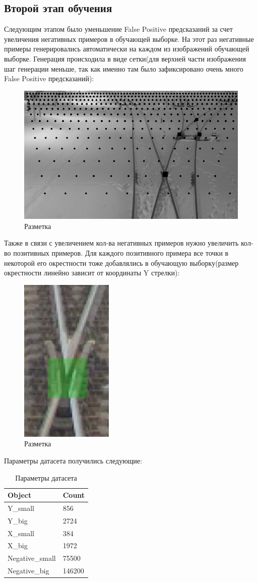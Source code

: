 \subsection{Второй этап обучения}
Следующим этапом было уменьшение False Positive предсказаний за счет увеличения негативных примеров в обучающей выборке. На этот раз негативные примеры генерировались автоматически на каждом из изображений обучающей выборке. Генерация происходила в виде сетки(для верхней части изображения шаг генерации меньше, так как именно там было зафиксировано очень много False Positive предсказаний):
\begin{figure}[h!]
	\centering
	\includegraphics[width=0.7\linewidth]{pictures/grid_negative.png}
	\caption{Разметка}
	\label{fig:screenshot32}
\end{figure}
\newline
Также в связи с увеличением кол-ва негативных примеров нужно увеличить кол-во позитивных примеров. Для каждого позитивного примера все точки в некоторой его окрестности тоже добавлялись в обучающую выборку(размер окрестности линейно зависит от координаты Y стрелки):
\begin{figure}[!h]
	\centering
	\includegraphics[width=0.1\linewidth]{pictures/screenshot2323}
	\caption{Разметка}
	\label{fig:screenshot2323}
\end{figure}
\newpage
Параметры датасета получились следующие:
\begin{table}[!h]
	\begin{tabular}{|l|l|}
		\hline
		\textbf{Object} & \textbf{Count} \\ \hline
		Y\_small        & 856            \\ \hline
		Y\_big          & 2724           \\ \hline
		X\_small        & 384            \\ \hline
		X\_big          & 1972           \\ \hline
		Negative\_small & 75500          \\ \hline
		Negative\_big   & 146200         \\ \hline
	\end{tabular}
	\label{tab:params2}
	\caption{Параметры датасета}
\end{table}

